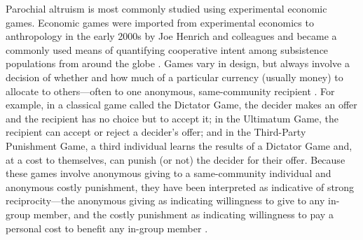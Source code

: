\documentclass[bibauthoryear]{aa}
\begin{document}
Parochial altruism is most commonly studied using experimental economic games. Economic games were imported from experimental economics to anthropology in the early 2000s by Joe Henrich and colleagues \citep{henrich2001search} and became a commonly used means of quantifying cooperative intent among subsistence populations from around the globe \citep{henrich2005economic, ensminger2014experimenting}. Games vary in design, but always involve a decision of whether and how much of a particular currency (usually money) to allocate to others---often to one anonymous, same-community recipient \citep[see][for an overview]{Pisor2020}. For example, in a classical game called the Dictator Game, the decider makes an offer and the recipient has no choice but to accept it; in the Ultimatum Game, the recipient can accept or reject a decider's offer; and in the Third-Party Punishment Game, a third individual learns the results of a Dictator Game and, at a cost to themselves, can punish (or not) the decider for their offer. Because these games involve anonymous giving to a same-community individual and anonymous costly punishment, they have been interpreted as indicative of strong reciprocity---the anonymous giving as indicating willingness to give to any in-group member, and the costly punishment as indicating willingness to pay a personal cost to benefit any in-group member\citep{marlowe2008more} \citep[see][for a review]{guala2012reciprocity}.
\end{document}
